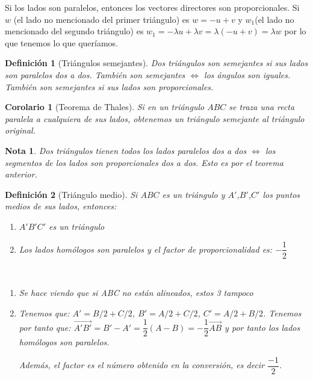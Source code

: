 \documentclass[11pt, a4paper]{article}
\makeatletter
\newif\IfInSansMode
\let\oldsf\sffamily
\renewcommand*{\sffamily}{\oldsf\mathversion{sans}\InSansModetrue}
\let\oldnorm\normalfont
\renewcommand*{\normalfont}{\oldnorm\InSansModefalse\mathversion{normal}}
\renewenvironment{proof}[1][\proofname] {\vspace{-15pt}\par\pushQED{\qed}\normalfont\topsep6\p@\@plus6\p@\relax\trivlist\item[\hskip\labelsep\it#1\@addpunct{.}]\ignorespaces}{\popQED\endtrivlist\@endpefalse}
\renewcommand{\vec}{\overrightarrow}
\renewenvironment{proof}[1][\proofname] {\par\pushQED{\qed}\normalfont\topsep6\p@\@plus6\p@\relax\trivlist\item[\hskip\labelsep\itshape\sffamily#1\@addpunct{.}]\ignorespaces}{\popQED\endtrivlist\@endpefalse}
\theoremstyle{theorem-style}
\newtheorem{ncor}{Corolario}[section]
\theoremstyle{definition-style}
\newtheorem{ndef}{Definición}[section]
\theoremstyle{remark-style}
\newtheorem*{nota}{Nota}
\theoremstyle{example-style}
\newenvironment{nlist}
{\begin{enumerate}
    \renewcommand\labelenumi{(\emph{\roman{enumi})}}}
  {\end{enumerate}}
\makeatother
\begin{document}
  \begin{proof}
    Si los lados son paralelos, entonces los vectores directores son proporcionales.
    Si $w$ (el lado no mencionado del primer triángulo) es $w=-u+v$ y $w_1$(el lado no mencionado del segundo triángulo) es $w_1 = - \lambda u + \lambda v = \lambda (-u+v) = \lambda w$  por lo que tenemos lo que queríamos.
  \end{proof}

\begin{ndef}[Triángulos semejantes]
  Dos triángulos son semejantes si sus lados son paralelos dos a dos. También son semejantes $\iff$ los ángulos son iguales. También son semejantes si sus lados son proporcionales.
\end{ndef}

\begin{ncor}[Teorema de Thales]
  Si en un triángulo $ABC$ se traza una recta paralela a cualquiera de sus lados, obtenemos un triángulo semejante al triángulo original.
\end{ncor}

\begin{nota}
  Dos triángulos tienen todos los lados paralelos dos a dos $\iff$ los segmentos de los lados son proporcionales dos a dos. Esto es por el teorema anterior.
\end{nota}

\begin{ndef}[Triángulo medio]
  Si $ABC$ es un triángulo y $A'$,$B'$,$C'$ los puntos medios de sus lados, entonces:
  \begin{nlist}
  \item $A'B'C'$ es un triángulo
  \item Los lados homólogos son paralelos y el factor de proporcionalidad es: $-\dfrac{1}{2}$
  \end{nlist}\vspace{0.2cm}
  \begin{proof}\hfill\\

    \begin{nlist}
    \item Se hace viendo que si ABC no están alineados, estos 3 tampoco
    \item Tenemos que: $A' = B/2 + C/2$, $B' = A/2+C/2$, $C' = A/2 + B/2$. Tenemos por tanto que: $\vec{A'B'} = B'-A' = \dfrac{1}{2}(A-B) = -\dfrac{1}{2} \vec{AB}$ y por tanto los lados homólogos son paralelos.

      Además, el factor es el número obtenido en la conversión, es decir $\dfrac{-1}{2}$.
    \end{nlist}
  \end{proof}
\end{ndef}
\end{document}
